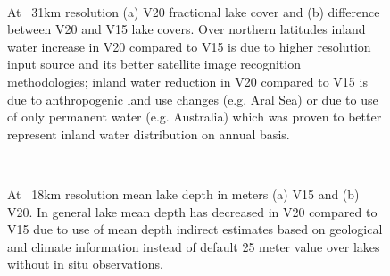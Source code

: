 \documentclass[hess, twostagejnl]{copernicus}
\begin{document}
\begin{figure}
	 \\
	\caption{At ~31km resolution (a) V20 fractional lake cover and (b) difference between V20 and V15 lake covers. Over northern latitudes inland water increase in V20 compared to V15 is due to higher resolution input source and its better satellite image recognition methodologies; inland water reduction in V20 compared to V15 is due to anthropogenic land use changes (e.g. Aral Sea) or due to use of only permanent water (e.g. Australia) which was proven to better represent inland water distribution on annual basis.} 
	\label{fig:example_figure_a}
\end{figure}








\begin{figure}
	 \\
	\caption{At ~18km resolution mean lake depth in meters (a) V15 and (b) V20. In general lake mean depth has decreased in V20 compared to V15 due to use of mean depth indirect estimates based on geological and climate information instead of default 25 meter value over lakes without in situ observations.} 
	\label{fig:example_figure_b}
	\end{figure}
\end{document}
